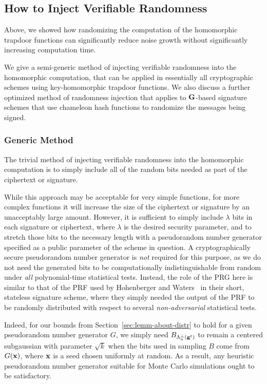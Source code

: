 \subsection{How to Inject Verifiable Randomness}
\label{sec:how-inject-rand}
Above, we showed how randomizing the computation of
the homomorphic trapdoor functions can significantly reduce noise
growth without significantly increasing computation time. 

We give a semi-generic method of injecting verifiable randomness into the
homomorphic computation, that can be applied in essentially all
cryptographic schemes using key-homomorphic trapdoor functions. We also discuss a further optimized method of randomness
injection that applies to $\mathbf{G}$-based signature schemes that use
chameleon hash functions to randomize the messages being signed. 

\subsubsection{Generic Method}
\label{sec:generic-method}
The trivial method of injecting verifiable randomness into the
homomorphic computation is to simply include all of the random bits
needed as part of the ciphertext or signature. 

While this approach may
be acceptable for very simple functions, for more complex functions it
will increase the size of the ciphertext or signature by an
unacceptably large amount. 
However, it is sufficient to simply include $\lambda$ bits in each
signature or ciphertext, where
$\lambda$ is the desired security parameter, and to stretch those bits
to the necessary length with a pseudorandom number generator specified as a
public parameter of the scheme in question. A cryptographically secure pseudorandom number
generator is \emph{not} required for this purpose, as we do not need
the generated bits to be computationally indistinguishable from random
under \emph{all} polynomial-time statistical tests. Instead, the role
of the PRG here is similar to that of the PRF used by Hohenberger and
Waters~\cite{DBLP:conf/crypto/HohenbergerW09} in their short,
stateless signature scheme, where they simply needed the output of the
PRF to be randomly distributed with respect to several \emph{non-adversarial}
statistical tests.

Indeed, for our bounds from Section~\ref{sec:lemm-about-distr} to hold for
a given pseudorandom number generator $G$, we simply need
$B_{\Lambda^{\perp}_{u}(\mathbf{g}^t)}$ to remain a centered subgaussian with
parameter $\sqrt{k}$ when the bits used in sampling $B$ come from
$G(\mathbf{x})$, where $\mathbf{x}$ is a seed chosen uniformly at random. As a
result, any heuristic pseudorandom number generator suitable for Monte
Carlo simulations ought to be satisfactory.

